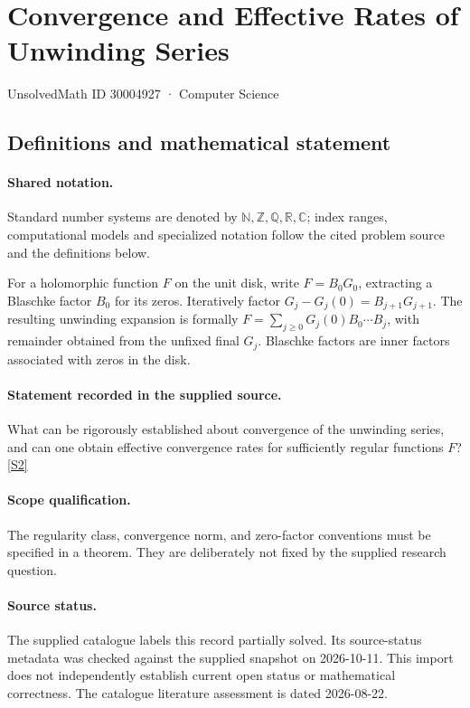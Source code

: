\documentclass[11pt]{article}
\newcommand{\sref}[2]{\hyperlink{source:#1:#2}{[S#2]}}
\begin{document}
\setcounter{section}{30004926}
\section{Convergence and Effective Rates of Unwinding Series}\label{30004927}
{\small\sffamily UnsolvedMath ID 30004927 · Computer Science}
\subsection{Definitions and mathematical statement}

\paragraph{Shared notation.}Standard number systems are denoted by $\mathbb N,\mathbb Z,\mathbb Q,\mathbb R,\mathbb C$; index ranges, computational models and specialized notation follow the cited problem source and the definitions below.


For a holomorphic function $F$ on the unit disk, write $F=B_0G_0$, extracting a Blaschke factor $B_0$ for its zeros. Iteratively factor $G_j-G_j(0)=B_{j+1}G_{j+1}$. The resulting unwinding expansion is formally $F=\sum_{j\geq0}G_j(0)B_0\cdots B_j$, with remainder obtained from the unfixed final $G_j$. Blaschke factors are inner factors associated with zeros in the disk.
\paragraph{Statement recorded in the supplied source.}
What can be rigorously established about convergence of the unwinding series, and can one obtain effective convergence rates for sufficiently regular functions $F$? \sref{30004927}{2}
\paragraph{Scope qualification.}
The regularity class, convergence norm, and zero-factor conventions must be specified in a theorem. They are deliberately not fixed by the supplied research question.
\paragraph{Source status.}
The supplied catalogue labels this record partially solved. Its source-status metadata was checked against the supplied snapshot on 2026-10-11. This import does not independently establish current open status or mathematical correctness. The catalogue literature assessment is dated 2026-08-22.
\end{document}
